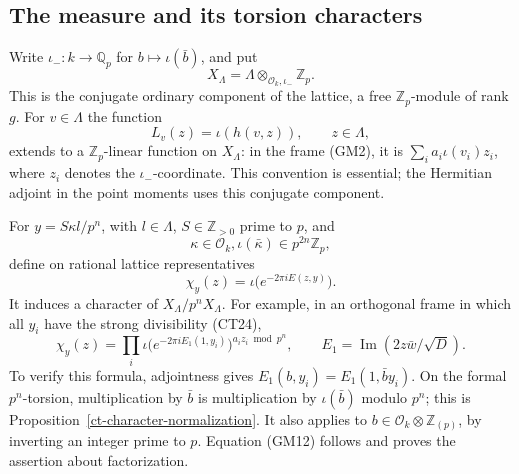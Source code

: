 \subsection{The measure and its torsion characters}

Write $\iota_-:k\to\mathbb Q_p$ for $b\mapsto\iota(\bar b)$,
and put
\[
                 X_\Lambda=\Lambda\otimes_{\mathcal O_k,\iota_-}
                                            \mathbb Z_p.        \tag{GM8}
\]
This is the conjugate ordinary component of the lattice, a free
$\mathbb Z_p$-module of rank $g$.  For $v\in\Lambda$ the
function
\[
              L_v(z)=\iota(h(v,z)),\qquad z\in\Lambda,
                                                               \tag{GM9}
\]
extends to a $\mathbb Z_p$-linear function on $X_\Lambda$:
in the frame (GM2), it is
$\sum_i a_i\iota(v_i)z_i$, where $z_i$ denotes the
$\iota_-$-coordinate.  This convention is essential; the
Hermitian adjoint in the point moments uses this conjugate
component.

For $y=S\kappa l/p^n$, with $l\in\Lambda$,
$S\in\mathbb Z_{>0}$ prime to $p$, and
\[
        \kappa\in\mathcal O_k,
                   \iota(\bar\kappa)\in p^{2n}\mathbb Z_p,
                                                               \tag{GM10}
\]
define on rational lattice representatives
\[
                  \chi_y(z)=\iota\bigl(e^{-2\pi iE(z,y)}\bigr).
                                                               \tag{GM11}
\]
It induces a character of $X_\Lambda/p^nX_\Lambda$.
For example, in an orthogonal frame in which all $y_i$ have
the strong divisibility (CT24),
\[
        \chi_y(z)=\prod_i
          \iota\bigl(e^{-2\pi iE_1(1,y_i)}\bigr)^{a_i z_i\bmod p^n},
             \qquad E_1=\operatorname{Im}(2z\bar w/\sqrt D).
                                                               \tag{GM12}
\]
To verify this formula, adjointness gives
$E_1(b,y_i)=E_1(1,\bar b y_i)$.
On the formal $p^n$-torsion, multiplication by $\bar b$ is
multiplication by $\iota(\bar b)$ modulo $p^n$; this is
Proposition~\ref{ct-character-normalization}.  It also applies
to $b\in\mathcal O_k\otimes\mathbb Z_{(p)}$, by inverting
an integer prime to $p$.  Equation (GM12) follows and proves
the assertion about factorization.

